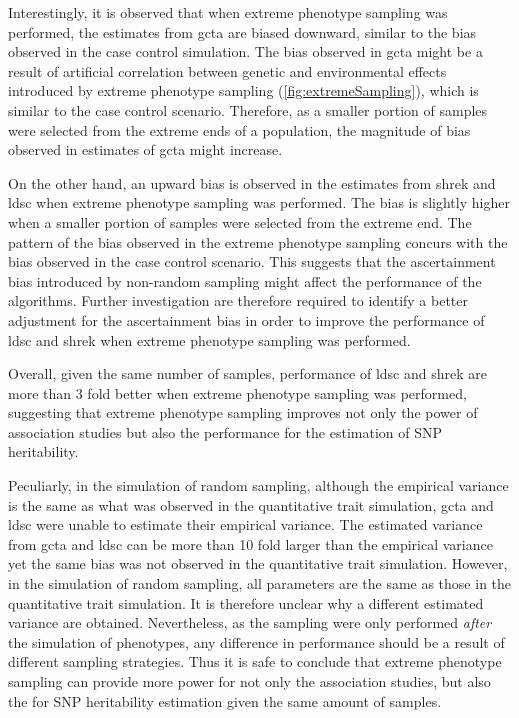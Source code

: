 	Interestingly, it is observed that when extreme phenotype sampling was performed, the estimates from \gls{gcta} are biased downward, similar to the bias observed in the case control simulation.
	The bias observed in \gls{gcta} might be a result of artificial correlation between genetic and environmental effects introduced by extreme phenotype sampling (\cref{fig:extremeSampling}), which is similar to the case control scenario.
	Therefore, as a smaller portion of samples were selected from the extreme ends of a population, the magnitude of bias observed in estimates of \gls{gcta} might increase.
	
	On the other hand, an upward bias is observed in the estimates from \gls{shrek} and \gls{ldsc} when extreme phenotype sampling was performed. 
	The bias is slightly higher when a smaller portion of samples were selected from the extreme end.
	The pattern of the bias observed in the extreme phenotype sampling concurs with the bias observed in the case control scenario.
	This suggests that the ascertainment bias introduced by non-random sampling might affect the performance of the algorithms.
	Further investigation are therefore required to identify a better adjustment for the ascertainment bias in order to improve the performance of \gls{ldsc} and \gls{shrek} when extreme phenotype sampling was performed.
	
	Overall, given the same number of samples, performance of \gls{ldsc} and \gls{shrek} are more than 3 fold better when extreme phenotype sampling was performed, suggesting that extreme phenotype sampling improves not only the power of association studies but also the performance for the estimation of \gls{SNP} heritability.
	
	Peculiarly, in the simulation of random sampling, although the empirical variance is the same as what was observed in the quantitative trait simulation, \gls{gcta} and \gls{ldsc} were unable to estimate their empirical variance. 
	The estimated variance from \gls{gcta} and \gls{ldsc} can be more than 10 fold larger than the empirical variance yet the same bias was not observed in the quantitative trait simulation.
	However, in the simulation of random sampling, all parameters are the same as those in the quantitative trait simulation. 
	It is therefore unclear why a different estimated variance are obtained. 
	Nevertheless, as the sampling were only performed \emph{after} the simulation of phenotypes, any difference in performance should be a result of different sampling strategies. 
	Thus it is safe to conclude that extreme phenotype sampling can provide more power for not only the association studies, but also the for \gls{SNP} heritability estimation given the same amount of samples.
	
